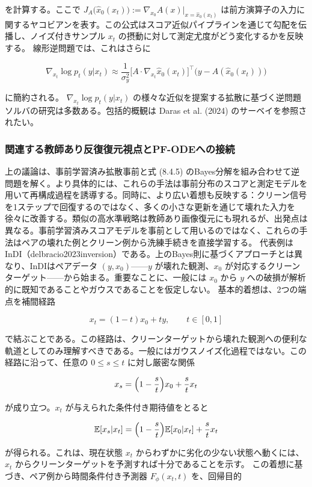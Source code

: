 を計算する。ここで $J_A\bigl(\hat{x}_0(x_t)\bigr):=\nabla_{x_0}A(x)\big|_{x=\hat{x}_0(x_t)}$ は前方演算子の入力に関するヤコビアンを表す。この公式はスコア近似パイプラインを通じて勾配を伝播し、ノイズ付きサンプル $x_t$ の摂動に対して測定尤度がどう変化するかを反映する。
線形逆問題では、これはさらに

\[
\nabla_{x_t}\log p_t(y|x_t)\approx\frac{1}{\sigma_y^2}\bigl[A\cdot\nabla_{x_t}\hat{x}_0(x_t)\bigr]^\top\bigl(y-A(\hat{x}_0(x_t))\bigr)
\]


に簡約される。
$\nabla_{x_t}\log p_t(y|x_t)$ の様々な近似を提案する拡散に基づく逆問題ソルバの研究は多数ある。包括的概観は Daras et al. (2024) のサーベイを参照されたい。

\subsubsection*{関連する教師あり反復復元視点とPF-ODEへの接続}


上の議論は、事前学習済み拡散事前と式 (8.4.5) のBayes分解を組み合わせて逆問題を解く。より具体的には、これらの手法は事前分布のスコアと測定モデルを用いて再構成過程を誘導する。同時に、より広い着想も反映する：クリーン信号を1ステップで回復するのではなく、多くの小さな更新を通じて壊れた入力を徐々に改善する。類似の高水準戦略は教師あり画像復元にも現れるが、出発点は異なる。事前学習済みスコアモデルを事前として用いるのではなく、これらの手法はペアの壊れた例とクリーン例から洗練手続きを直接学習する。
代表例は InDI（delbracio2023inversion）である。上のBayes則に基づくアプローチとは異なり、InDIはペアデータ $(y,x_0)$——$y$ が壊れた観測、$x_0$ が対応するクリーンターゲット——から始まる。重要なことに、一般には $x_0$ から $y$ への破損が解析的に既知であることやガウスであることを仮定しない。
基本的着想は、2つの端点を補間経路

\[
x_t=(1-t)x_0+t y,\qquad t\in[0,1]
\]


で結ぶことである。この経路は、クリーンターゲットから壊れた観測への便利な軌道としてのみ理解すべきである。一般にはガウスノイズ化過程ではない。この経路に沿って、任意の $0\le s\le t$ に対し厳密な関係

\[
x_s=\Bigl(1-\frac{s}{t}\Bigr)x_0+\frac{s}{t}x_t
\]


が成り立つ。$x_t$ が与えられた条件付き期待値をとると

\[
\mathbb{E}[x_s|x_t]=\Bigl(1-\frac{s}{t}\Bigr)\mathbb{E}[x_0|x_t]+\frac{s}{t}x_t
\]


が得られる。これは、現在状態 $x_t$ からわずかに劣化の少ない状態へ動くには、$x_t$ からクリーンターゲットを予測すれば十分であることを示す。
この着想に基づき、ペア例から時間条件付き予測器 $F_\phi(x_t,t)$ を、回帰目的

